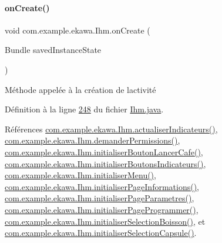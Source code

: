 \mbox{\label{classcom_1_1example_1_1ekawa_1_1_ihm_af37a1d1d731eaed5e9cc19d23475ede3}} 
\paragraph{\texorpdfstring{on\+Create()}{onCreate()}}
{\footnotesize\ttfamily void com.\+example.\+ekawa.\+Ihm.\+on\+Create (\begin{DoxyParamCaption}\item[{Bundle}]{saved\+Instance\+State }\end{DoxyParamCaption})\hspace{0.3cm}{\ttfamily [protected]}}



Méthode appelée à la création de l\textquotesingle{}activité 



Définition à la ligne \hyperlink{_ihm_8java_source_l00248}{248} du fichier \hyperlink{_ihm_8java_source}{Ihm.\+java}.



Références \hyperlink{_ihm_8java_source_l00855}{com.\+example.\+ekawa.\+Ihm.\+actualiser\+Indicateurs()}, \hyperlink{_ihm_8java_source_l00325}{com.\+example.\+ekawa.\+Ihm.\+demander\+Permissions()}, \hyperlink{_ihm_8java_source_l00526}{com.\+example.\+ekawa.\+Ihm.\+initialiser\+Bouton\+Lancer\+Cafe()}, \hyperlink{_ihm_8java_source_l00357}{com.\+example.\+ekawa.\+Ihm.\+initialiser\+Boutons\+Indicateurs()}, \hyperlink{_ihm_8java_source_l00550}{com.\+example.\+ekawa.\+Ihm.\+initialiser\+Menu()}, \hyperlink{_ihm_8java_source_l00637}{com.\+example.\+ekawa.\+Ihm.\+initialiser\+Page\+Informations()}, \hyperlink{_ihm_8java_source_l00835}{com.\+example.\+ekawa.\+Ihm.\+initialiser\+Page\+Parametres()}, \hyperlink{_ihm_8java_source_l00668}{com.\+example.\+ekawa.\+Ihm.\+initialiser\+Page\+Programmer()}, \hyperlink{_ihm_8java_source_l00470}{com.\+example.\+ekawa.\+Ihm.\+initialiser\+Selection\+Boisson()}, et \hyperlink{_ihm_8java_source_l00413}{com.\+example.\+ekawa.\+Ihm.\+initialiser\+Selection\+Capsule()}.


